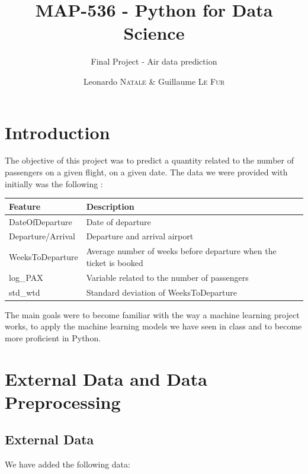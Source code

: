 \documentclass[a4paper,12pt,twoside]{article}
\title{MAP-536 - Python for Data Science}
\subtitle{Final Project - Air data prediction}
\author{Leonardo \textsc{Natale} \& Guillaume \textsc{Le Fur}}
\begin{document}
\maketitle

\section{Introduction}

The objective of this project was to predict a quantity related to the number of passengers on a given flight, on a given date. The data we were provided with initially was the following :

\begin{table}[H]
	\centering
	\begin{tabular}{|l|l|}
	\hline
	\textbf{Feature} & \textbf{Description}                          \\ \hline
	DateOfDeparture  & Date of departure                             \\ \hline
	Departure/Arrival& Departure and arrival airport                 \\ \hline
	WeeksToDeparture & Average number of weeks before departure when the ticket is booked \\ \hline
	log\_PAX          & Variable related to the number of passengers \\ \hline
	std\_wtd          & Standard deviation of WeeksToDeparture       \\ \hline
	\end{tabular}
	\label{table:orig_data}
\end{table}

The main goals were to become familiar with the way a machine learning project works, to apply the machine learning models we have seen in class and to become more proficient in Python.

\section{External Data and Data Preprocessing}

\subsection{External Data}

We have added the following data:
\end{document}
